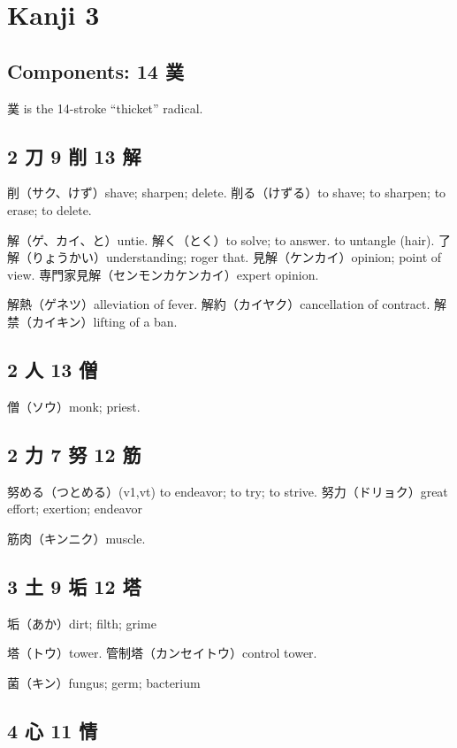 \chapter{Kanji 3}

\section{Components: 14 菐}

菐 is the 14-stroke ``thicket'' radical.

\section{2 刀 9 削 13 解}

削（サク、けず）shave; sharpen; delete.
削る（けずる）to shave; to sharpen; to erase; to delete.

解（ゲ、カイ、と）untie.
解く（とく）to solve; to answer. to untangle (hair).
了解（りょうかい）understanding; roger that.
見解（ケンカイ）opinion; point of view.
専門家見解（センモンカケンカイ）expert opinion.

解熱（ゲネツ）alleviation of fever.
解約（カイヤク）cancellation of contract.
解禁（カイキン）lifting of a ban.

\section{2 人 13 僧}

僧（ソウ）monk; priest.

\section{2 力 7 努 12 筋}

努める（つとめる）(v1,vt) to endeavor; to try; to strive.
努力（ドリョク）great effort; exertion; endeavor

筋肉（キンニク）muscle.

\section{3 土 9 垢 12 塔}

垢（あか）dirt; filth; grime

塔（トウ）tower.
管制塔（カンセイトウ）control tower.

菌（キン）fungus; germ; bacterium

\section{4 心 11 情}

